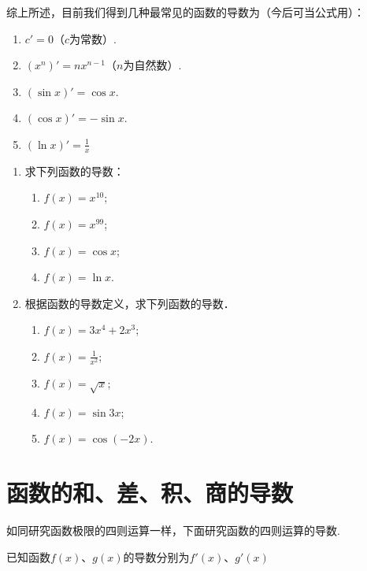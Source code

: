 综上所述，目前我们得到几种最常见的函数的导数为（今后可当公式用）：
\begin{thm}{}
   \begin{enumerate}
\item $c'=0$（$c$为常数）.
\item $(x^n)'=nx^{n-1}$（$n$为自然数）.
\item $(\sin x)'=\cos x$.
\item $(\cos x)'=-\sin x$.
\item $(\ln x)'=\frac{1}{x}$
\end{enumerate}     
\end{thm}

\begin{ex}
\begin{enumerate}
    \item 求下列函数的导数：
\begin{multicols}{2}
\begin{enumerate}[(1)]
\item $f(x)=x^{10}$;
\item $f(x)=x^{99}$;
\item $f(x)=\cos x$;
\item $f(x)=\ln x$.
\end{enumerate}
\end{multicols}
    \item 根据函数的导数定义，求下列函数的导数．
\begin{multicols}{2}
\begin{enumerate}[(1)]
\item $f(x)=3x^4+2x^3$;
\item $f(x)=\frac{1}{x^2}$;
\item $f(x)=\sqrt{x}$;
\item $f(x)=\sin3x$;
\item $f(x)=\cos(-2x)$.
\end{enumerate}
\end{multicols}
\end{enumerate}
\end{ex}

\section{函数的和、差、积、商的导数}
如同研究函数极限的四则运算一样，下面研究函数的四则运算的导数.

已知函数$f(x)$、$g(x)$的导数分别为$f'(x)$、$g'(x)$

